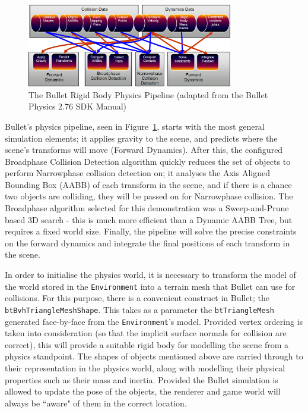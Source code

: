 \documentclass[a4paper,10pt]{article}
\begin{document}
\begin{figure}
  \begin{center}
    \includegraphics[width=340px]{BulletPipeline}
  \end{center}
  \caption[The Bullet Rigid Body Physics Pipeline]{The Bullet Rigid Body Physics Pipeline (adapted from the Bullet Physics 2.76 SDK Manual)}
  \label{bulletpipe}
\end{figure} 

Bullet's physics pipeline, seen in Figure~\ref{bulletpipe}, starts with the most general simulation elements; it applies gravity to the scene, and predicts where the scene's transforms will move (Forward Dynamics). After this, the configured Broadphase Collision Detection algorithm quickly reduces the set of objects to perform Narrowphase collision detection on; it analyses the Axis Aligned Bounding Box (AABB) of each transform in the scene, and if there is a chance two objects are colliding, they will be passed on for Narrowphase collision. The Broadphase algorithm selected for this demonstration was a Sweep-and-Prune based 3D search - this is much more efficient than a Dynamic AABB Tree, but requires a fixed world size. Finally, the pipeline will solve the precise constraints on the forward dynamics and integrate the final positions of each transform in the scene.

In order to initialise the physics world, it is necessary to transform the model of the world stored in the \texttt{Environment} into a terrain mesh that Bullet can use for collisions. For this purpose, there is a convenient construct in Bullet; the \texttt{btBvhTriangleMeshShape}. This takes as a parameter the \texttt{btTriangleMesh} generated face-by-face from the \texttt{Environment}'s model. Provided vertex ordering is taken into consideration (so that the implicit surface normals for collision are correct), this will provide a suitable rigid body for modelling the scene from a physics standpoint. The shapes of objects mentioned above are carried through to their representation in the physics world, along with modelling their physical properties such as their mass and inertia. Provided the Bullet simulation is allowed to update the pose of the objects, the renderer and game world will always be ``aware" of them in the correct location.
\end{document}
